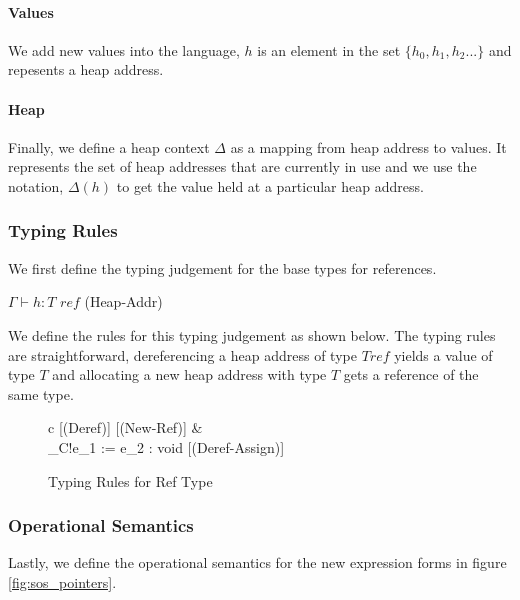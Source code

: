 \documentclass[a4paper,12pt]{report}
\begin{document}
\paragraph{Values}
We add new values into the language, $h$ is an element in the set 
$\{h_0, h_1, h_2...\}$ and repesents a heap address.

\paragraph{Heap}
Finally, we define a heap context $\Delta$ as a mapping from heap address to values.  
It represents the set of heap addresses that are currently in use and we use 
the notation, $\Delta(h)$ to get the value held at a particular heap address. 

\subsubsection{Typing Rules}
We first define the typing judgement for the base types for references. 

\begin{center}
   $\Gamma \vdash h : T\textit{ ref}$ (Heap-Addr)
\end{center}

\par
We define the rules for this typing judgement as shown below. 
The typing rules are straightforward, 
dereferencing a heap address of type $T \textit{ref}$ yields a value of type $T$ and 
allocating a new heap address with type $T$ gets a reference of the same type.

\begin{figure}[H]
  \begin{center}
    \begin{tabular} {c}
      [(Deref)]
      \text{ }
      [(New-Ref)]
      & \\
       {\Gamma \vdash_{C}\text{ }!e_1 := e_2 : void} 
      [(Deref-Assign)]
    \end{tabular}
  \end{center}
  \caption{Typing Rules for Ref Type}
\end{figure}


\subsubsection{Operational Semantics}
Lastly, we define the operational semantics for the new expression forms in figure 
\ref{fig:sos_pointers}.
\end{document}

